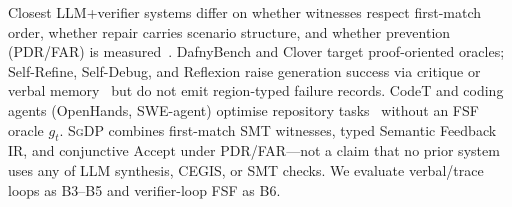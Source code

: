 Closest LLM+verifier systems differ on whether witnesses respect first-match
order, whether repair carries scenario structure, and whether prevention
(PDR/FAR) is measured~\cite{loughridge2024dafnybench,sun2024clover}.
DafnyBench and Clover target proof-oriented oracles; Self-Refine, Self-Debug,
and Reflexion raise generation success via critique or verbal
memory~\cite{madaan2023selfrefine,chen2024selfdebug,shinn2023reflexion} but do
not emit region-typed failure records.
CodeT and coding agents (OpenHands, SWE-agent) optimise repository
tasks~\cite{chen2023codet,wang2024opendevin,yang2024sweagent} without an FSF
oracle $g_t$.
\textsc{SgDP} combines first-match SMT witnesses, typed Semantic Feedback IR,
and conjunctive $\mathrm{Accept}$ under PDR/FAR---not a claim that no prior
system uses any of LLM synthesis, CEGIS, or SMT checks.
We evaluate verbal/trace loops as B3--B5 and verifier-loop FSF as B6.
